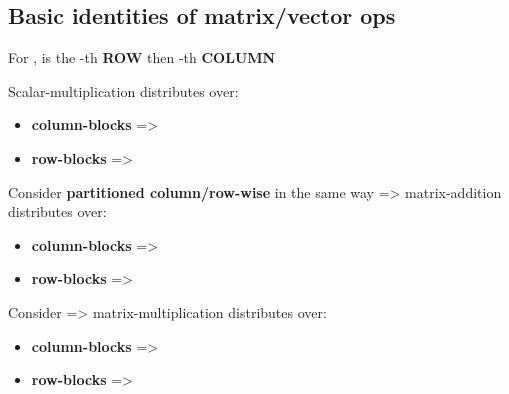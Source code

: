\subsection*{Basic identities of matrix/vector ops}

  
 

\hSep %

For ,  is the -th \textbf{ROW} then -th \textbf{COLUMN} \\

\hSep %

Scalar-multiplication distributes over:
\begin{itemize}
  \item
        \textbf{column-blocks} =\textgreater{}
  \item
        \textbf{row-blocks} =\textgreater{}
\end{itemize}

Consider  \textbf{partitioned  column/row-wise} in the same way => matrix-addition distributes over:
\begin{itemize}
  \item
        \textbf{column-blocks} =>
  \item
        \textbf{row-blocks} =>
\end{itemize}

Consider 
=> matrix-multiplication distributes over:
\begin{itemize}
  \item
        \textbf{column-blocks} =\textgreater{}
  \item
        \textbf{row-blocks} =\textgreater{}
\end{itemize}

